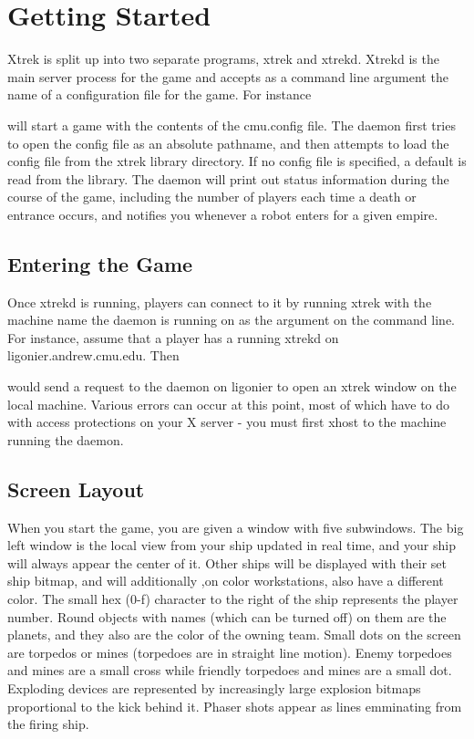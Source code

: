 \section{Getting Started}

Xtrek is split up into two separate programs, xtrek and xtrekd. Xtrekd
is the main server process for the game and accepts as a command line
argument the name of a configuration file for the game. For instance


will start a game with the contents of the cmu.config file. The daemon
first tries to open the config file as an absolute pathname, and then
attempts to load the config file from the xtrek library directory.  If
no config file is specified, a default is read from the library. The
daemon will print out status information during the course of the game,
including the number of players each time a death or entrance occurs,
and notifies you whenever a robot enters for a given empire.

\subsection{Entering the Game}

Once xtrekd is running, players can connect to it by running xtrek with
the machine name the daemon is running on as the argument on the
command line. For instance, assume that a player has a running xtrekd
on ligonier.andrew.cmu.edu.  Then


would send a request to the daemon on ligonier to open an xtrek window on the local
machine. Various errors can occur at this point, most of which have to
do with access protections on your X server - you must first xhost to
the machine running the daemon.

\subsection{Screen Layout}

When you start the game, you are given a window with five subwindows.  The big
left window is the local view from your ship updated in real time, and 
your ship will always appear the center of it.
Other ships will be displayed with their set ship bitmap, and will additionally
,on color workstations, also have a
different color.  The small hex (0-f) character to the right of the ship
represents the player number.  Round objects with names (which can be turned off) 
on them are the planets, and they also are the color of the owning team.  Small dots on
the screen are torpedos or mines (torpedoes are in straight line motion).  Enemy torpedoes 
and mines are a small cross while friendly torpedoes and mines are a small dot.  
Exploding devices are represented by increasingly large explosion bitmaps proportional to
the kick behind it.  Phaser shots appear as lines emminating from the firing ship.

